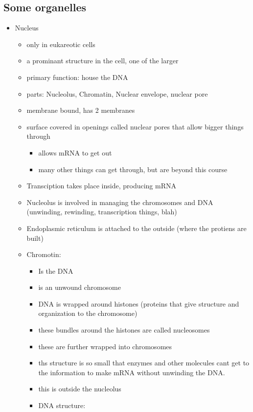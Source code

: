 \documentclass{article}
\theoremstyle{definition}
\begin{document}
\subsection{Some organelles}
\begin{itemize}
	\item Nucleus
		\begin{itemize}
			\item only in eukareotic cells
			\item a prominant structure in the cell, one of the larger
			\item primary function: house the DNA
			\item parts: Nucleolus, Chromatin, Nuclear envelope, nuclear pore
			\item membrane bound, has 2 membranes
			\item surface covered in openings called nuclear pores that allow bigger things through
				\begin{itemize}
					\item allows mRNA to get out
					\item many other things can get through, but are beyond this course
				\end{itemize}
			\item Transciption takes place inside, producing mRNA
			\item  Nucleolus is involved in managing the chromosomes and DNA (unwinding, rewinding, transcription things, blah)
			\item Endoplasmic reticulum is attached to the outside (where the protiens are built)
			\item Chromotin:
				\begin{itemize}
					\item Is the DNA
					\item is an unwound chromosome
					\item DNA is wrapped around histones (proteins that give structure and organization to the chromosome)
					\item these bundles around the histones are called nucleosomes
					\item these are further wrapped into chromosomes
					\item ths structure is so small that enzymes and other molecules cant get to the information to make mRNA without unwinding the DNA.
					\item this is outside the nucleolus
					\item DNA structure:
						\begin{itemize}

\end{itemize}
\end{itemize}
\end{itemize}
\end{itemize}
\end{document}
